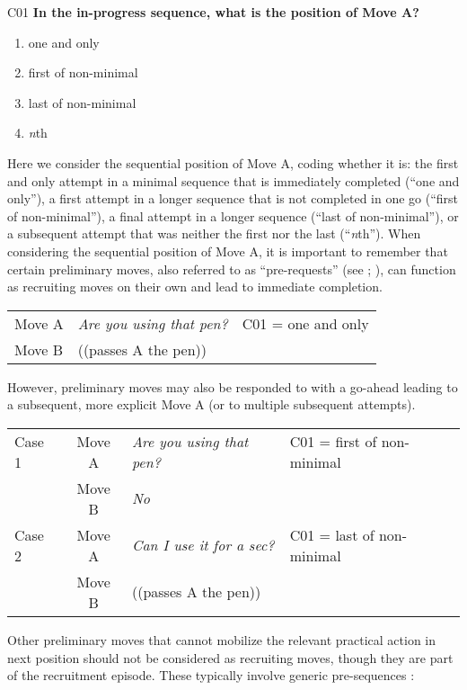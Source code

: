\documentclass[output=paper]{langsci/langscibook}
\begin{document}
\begin{description}
\item
C01  \textbf{In the in-progress sequence, what is the position of Move A?}

\begin{enumerate}
\item {one and only}
\item {first of non-minimal}
\item {last of non-minimal}
\item {\textit{n}th}
\end{enumerate}

{Here we consider the sequential position of Move A, coding whether it is: the first and only attempt in a minimal sequence that is immediately completed (“one and only”), a first attempt in a longer sequence that is not completed in one go (“first of non-minimal”), a final attempt in a longer sequence (“last of non-minimal”), or a subsequent attempt that was neither the first nor the last (``\textit{n}th'').}
{  When considering the sequential position of Move A, it is important to remember that certain preliminary moves, also referred to as “pre-requests” (see \citealt[chap. 6]{Levinson1983}; \citealt{Rossi2015b}), can function as recruiting moves on their own and lead to immediate completion.}

\begin{tabular}{l l l }
Move A & \textit{Are you using that pen?} &  C01 = one and only\\
Move B & ((passes A the pen)) &  \\
\end{tabular}

{However, preliminary moves may also be responded to with a go-ahead leading to a subsequent, more explicit Move A (or to multiple subsequent attempts).}

\begin{tabular}{l c l l}
{Case 1} &  Move A & \textit{Are you using that pen?} &  C01 = first of non-minimal \\
                &  Move B & \textit{No} & \\
{Case 2} &  Move A &  \textit{Can I use it for a sec?} &  C01 = last of non-minimal \\
                &  Move B & ((passes A the pen)) & \\
\end{tabular}

Other preliminary moves that cannot mobilize the relevant practical action in next position should not be considered as recruiting moves, though they are part of the recruitment episode. These typically involve generic pre-sequences \citep[chap. 4]{Schegloff2007}:


\end{description}
\end{document}
